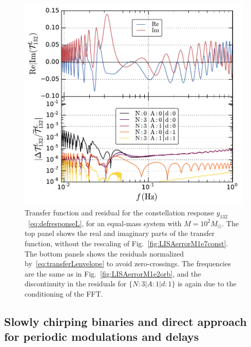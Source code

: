 \documentclass[aps,showpacs,twocolumn,
prd,superscriptaddress,nofootinbib]{revtex4-1}
\newcommand{\Msol}{M_{\odot}}
\begin{document}
\begin{figure}
  \centering
  \includegraphics[width=.98\linewidth]{plots/LISAtransfererrorM1e2y12L_py.pdf}
  \caption{Transfer function and residual for the constellation response $y_{132}$~\eqref{eq:defresponseL}, for an equal-mass system with $M=10^{2} \Msol$. The top panel shows the real and imaginary parts of the transfer function, without the rescaling of Fig.~\ref{fig:LISAerrorM1e7const}. The bottom panels shows the residuals normalized by~\eqref{eq:transferLenvelope} to avoid zero-crossings. The frequencies are the same as in Fig.~\ref{fig:LISAerrorM1e2orb}, and the discontinuity in the residuals for $\{N:3|A:1|d:1\}$ is again due to the conditioning of the FFT.}
  \label{fig:LISAerrorM1e2const}
\end{figure}


\subsection{Slowly chirping binaries and direct approach for periodic modulations and delays}\label{subsec:comblisa}
\end{document}
